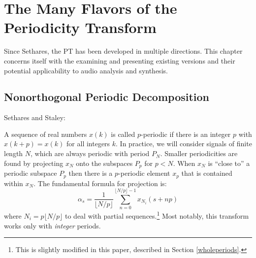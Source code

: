 \chapter{The Many Flavors of the Periodicity Transform}
Since Sethares, the PT has been developed in multiple directions. This chapter concerns itself with the examining and presenting existing versions and their potential applicability to audio analysis and synthesis.

\section{Nonorthogonal Periodic Decomposition}
    Sethares and Staley:

    A sequence of real numbers $x(k)$ is called $p$-periodic if there is an integer $p$ with $x(k+p) = x(k)$ for all integers $k$. In practice, we will consider signals of finite length $N$, which are always periodic with period $P_N$. Smaller periodicities are found by projecting $x_N$ onto the subspaces $P_p$ for $p < N$. When $x_N$ is “close to” a periodic subspace $P_p$ then there is a $p$-periodic element $x_p$ that is contained within $x_N$. The fundamental formula for projection is:
    \begin{equation} \label{eq:proj}
      \alpha_s = \frac{1}{\lfloor N/p \rfloor} \sum_{n=0}^{\lfloor N/p \rfloor -1} x_{N_i} (s + np)
    \end{equation}
    where $N_i = p \lfloor N/p \rfloor$ to deal with partial sequences.\footnote{This is slightly modified in this paper, described in Section \ref{wholeperiods}.} Most notably, this transform works only with \emph{integer} periods.


